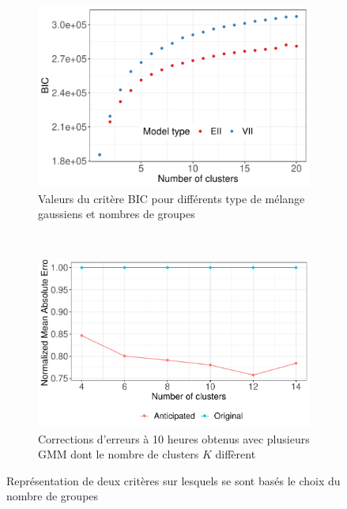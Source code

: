 \documentclass[12pt]{report}
\begin{document}
\begin{figure}[h]
	\begin{subfigure}{0.5\linewidth}
		\centering
		\includegraphics[width = 0.9 \linewidth]{Images/PV/GMM/GMM_BICCompare_20.pdf}
		\caption{Valeurs du critère BIC pour différents type de mélange gaussiens et nombres de groupes}
		\label{fig:PV_GMM_BIC}
	\end{subfigure}
	~
	\begin{subfigure}{0.5\linewidth}
		\centering
		\includegraphics[width = 0.9 \linewidth]{Images/PV/GMM/GMM_CompareIntraday.pdf}
		\caption{Corrections d'erreurs à 10 heures obtenus avec plusieurs GMM dont le nombre de clusters $K$ diffèrent}
		\label{fig:PV_GMM_IntradayComp}
	\end{subfigure}
	\caption{Représentation de deux critères sur lesquels se sont basés le choix du nombre de groupes}
\end{figure}
\end{document}
